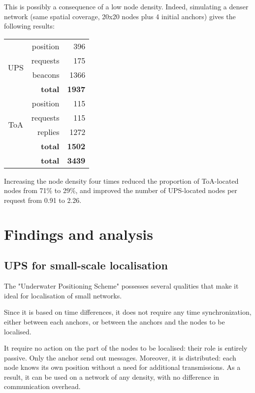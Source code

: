 \documentclass[12pt,a4paper,fleqn]{report}
\begin{document}
This is possibly a consequence of a low node density. Indeed, simulating a denser network (same spatial coverage, 20x20 nodes plus 4 initial anchors) gives the following results:

\begin{table}[H]
\centering
\begin{tabular}{|c|r|r|}
	\hline
	\multirow{4}{*}{UPS}
	& position			& 396	\\
	& requests			& 175	\\
	& beacons			& 1366	\\
	& \textbf{total}	& \textbf{1937}	\\
	\hline
	\multirow{4}{*}{ToA}
	& position			& 115	\\
	& requests			& 115	\\
	& replies			& 1272	\\
	& \textbf{total}	& \textbf{1502}	\\
	\hline
	\multicolumn{2}{|r|}{\textbf{total}}
						& \textbf{3439}	\\
	\hline
\end{tabular}
\end{table}

Increasing the node density four times reduced the proportion of ToA-located nodes from 71\% to 29\%, and improved the number of UPS-located nodes per request from 0.91 to 2.26.

\chapter{Findings and analysis}

\section{UPS for small-scale localisation}

The "Underwater Positioning Scheme" possesses several qualities that make it ideal for localisation of small networks.

Since it is based on time differences, it does not require any time synchronization, either between each anchors, or between the anchors and the nodes to be localised.

It require no action on the part of the nodes to be localised: their role is entirely passive. Only the anchor send out messages. Moreover, it is distributed: each node knows its own position without a need for additional transmissions. As a result, it can be used on a network of any density, with no difference in communication overhead.
\end{document}
